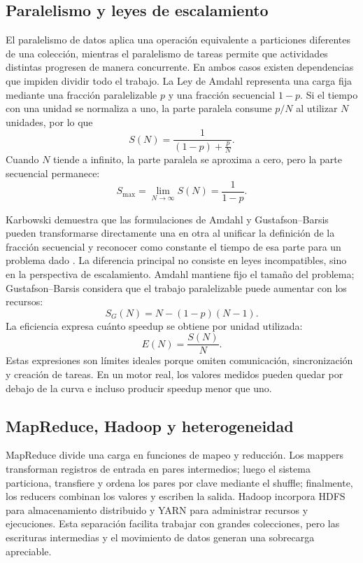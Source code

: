 \documentclass[11pt,a4paper]{article}
\begin{document}
\subsection{Paralelismo y leyes de escalamiento}
El paralelismo de datos aplica una operación equivalente a particiones diferentes de una colección, mientras el paralelismo de tareas permite que actividades distintas progresen de manera concurrente. En ambos casos existen dependencias que impiden dividir todo el trabajo. La Ley de Amdahl representa una carga fija mediante una fracción paralelizable $p$ y una fracción secuencial $1-p$. Si el tiempo con una unidad se normaliza a uno, la parte paralela consume $p/N$ al utilizar $N$ unidades, por lo que
\begin{equation}
S(N)=\frac{1}{(1-p)+\frac{p}{N}}.
\label{eq:amdahl}
\end{equation}
Cuando $N$ tiende a infinito, la parte paralela se aproxima a cero, pero la parte secuencial permanece:
\begin{equation}
S_{\max}=\lim_{N\to\infty}S(N)=\frac{1}{1-p}.
\label{eq:smax}
\end{equation}

Karbowski demuestra que las formulaciones de Amdahl y Gustafson--Barsis pueden transformarse directamente una en otra al unificar la definición de la fracción secuencial y reconocer como constante el tiempo de esa parte para un problema dado \cite{karbowski2025}. La diferencia principal no consiste en leyes incompatibles, sino en la perspectiva de escalamiento. Amdahl mantiene fijo el tamaño del problema; Gustafson--Barsis considera que el trabajo paralelizable puede aumentar con los recursos:
\begin{equation}
S_G(N)=N-(1-p)(N-1).
\label{eq:gustafson}
\end{equation}
La eficiencia expresa cuánto speedup se obtiene por unidad utilizada:
\begin{equation}
E(N)=\frac{S(N)}{N}.
\label{eq:eficiencia}
\end{equation}
Estas expresiones son límites ideales porque omiten comunicación, sincronización y creación de tareas. En un motor real, los valores medidos pueden quedar por debajo de la curva e incluso producir speedup menor que uno.

\subsection{MapReduce, Hadoop y heterogeneidad}
MapReduce divide una carga en funciones de mapeo y reducción. Los mappers transforman registros de entrada en pares intermedios; luego el sistema particiona, transfiere y ordena los pares por clave mediante el shuffle; finalmente, los reducers combinan los valores y escriben la salida. Hadoop incorpora HDFS para almacenamiento distribuido y YARN para administrar recursos y ejecuciones. Esta separación facilita trabajar con grandes colecciones, pero las escrituras intermedias y el movimiento de datos generan una sobrecarga apreciable.
\end{document}
